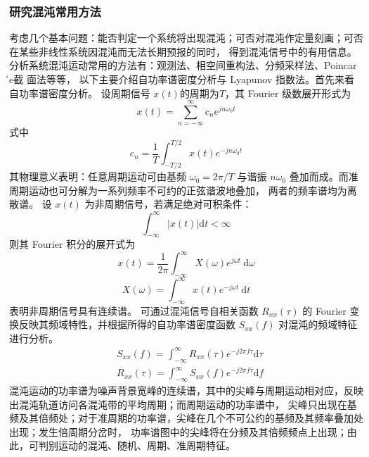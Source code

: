 \subsubsection{研究混沌常用方法}
考虑几个基本问题：能否判定一个系统将出现混沌；可否对混沌作定量刻画；可否在某些非线性系统因混沌而无法长期预报的同时，
得到混沌信号中的有用信息。分析系统混沌运动常用的方法有：观测法、相空间重构法、分频采样法、Poincar ́e截 面法等等，
以下主要介绍自功率谱密度分析与 Lyapunov 指数法。首先来看自功率谱密度分析。
设周期信号 $x(t)$的周期为$T$，其 Fourier 级数展开形式为
\begin{equation}
    x(t)=\sum_{n=-\infty}^{\infty} c_n e^{j n \omega_0 t}
\end{equation}
式中
\begin{equation}
    c_n=\frac{1}{T} \int_{-T / 2}^{T / 2} x(t) e^{-j n \omega_0 t}
\end{equation}
其物理意义表明：任意周期运动可由基频 $\omega_0 = 2\pi /T$ 与谐振 $n\omega_0$ 叠加而成。而准周期运动也可分解为一系列频率不可约的正弦谐波地叠加，
两者的频率谱均为离散谱。
设 $x(t)$ 为非周期信号，若满足绝对可积条件：
\begin{equation}
    \int_{-\infty}^{\infty}|x(t)| \mathrm{d} t<\infty
\end{equation}
则其 Fourier 积分的展开式为
\begin{equation}
    x(t)=\frac{1}{2 \pi} \int_{-\infty}^{\infty} X(\omega) e^{j \omega t} \mathrm{~d} \omega
\end{equation}
\begin{equation}
    X(\omega)=\int_{-\infty}^{\infty} x(t) e^{-j \omega t} \mathrm{~d} t
\end{equation}
表明非周期信号具有连续谱。
可通过混沌信号自相关函数 $R_{x x}(\tau)$ 的 Fourier 变换反映其频域特性，并根据所得的自功率谱密度函数 $S_{x x}(f)$ 对混沌的频域特征进行分析。
\begin{equation}
    \begin{aligned}
    & S_{x x}(f)=\int_{-\infty}^{\infty} R_{x x}(\tau) e^{-j 2 \pi f \tau} \mathrm{d} \tau \\
    & R_{x x}(\tau)=\int_{-\infty}^{\infty} S_{x x}(f) e^{-j 2 \pi f \tau} \mathrm{d} f
    \end{aligned}
\end{equation}
混沌运动的功率谱为噪声背景宽峰的连续谱，其中的尖峰与周期运动相对应，反映出混沌轨道访问各混沌带的平均周期；而周期运动的功率谱中，
尖峰只出现在基频及其倍频处；对于准周期的功率谱，尖峰在几个不可公约的基频及其频率叠加处出现；发生倍周期分岔时，
功率谱图中的尖峰将在分频及其倍频频点上出现；由此，可判别运动的混沌、随机、周期、准周期特征。











